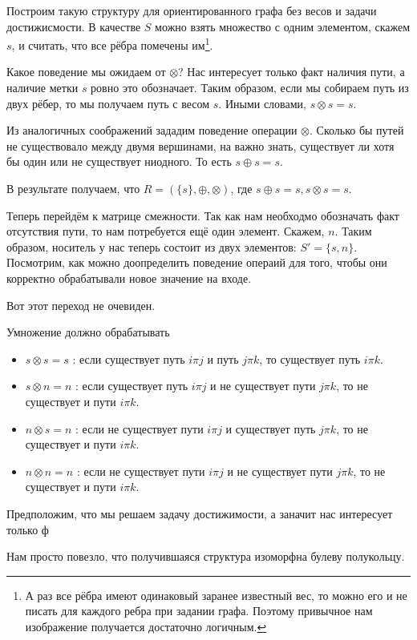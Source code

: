 \begin{example} Построим такую структуру для ориентированного графа без весов и задачи достижисмости. В качестве $S$ можно взять множество с одним элементом, скажем $s$, и считать, что все рёбра помечены им\footnote{А раз все рёбра имеют одинаковый заранее известный вес, то можно его и не писать для каждого ребра при задании графа. Поэтому привычное нам изображение получается достаточно логичным.}.  

Какое поведение мы ожидаем от $\otimes$? Нас интересует только факт наличия пути, а наличие метки $s$ ровно это обозначает. Таким образом, если мы собираем путь из двух рёбер, то мы получаем путь с весом $s$. Иными словами, $s \otimes s = s$. 

Из аналогичных соображений зададим поведение операции $\otimes$. Сколько бы путей не существовало между двумя вершинами, на важно знать, существует ли хотя бы один или не существует ниодного. То есть $s \oplus s = s$.

В результате получаем, что $R=(\{s\}, \oplus, \otimes)$, где $s \oplus s = s, s \otimes s = s$.

Теперь перейдём к матрице смежности. Так как нам необходмо обозначать факт отсутствия пути, то нам потребуется ещё один элемент. Скажем, $n$. Таким образом, носитель у нас теперь состоит из двух элементов: $S' = \{s,n\}$. Посмотрим, как можно доопределить поведение операий для того, чтобы они корректно обрабатывали новое значение на входе.

Вот этот переход не очевиден.

Умножение должно обрабатывать 
\begin{itemize}
\item $s \otimes s = s$ : если существует путь $i \pi j$ и путь $j \pi k$, то существует путь $i \pi k$.
\item $s \otimes n = n$ : если существует путь $i \pi j$ и не существует пути $j \pi k$, то не существует и пути $i \pi k$.
\item $n \otimes s = n$ : если не существует пути $i \pi j$ и существует путь $j \pi k$, то не существует и пути $i \pi k$.
\item $n \otimes n = n$ : если не существует пути $i \pi j$ и не существует пути $j \pi k$, то не существует и пути $i \pi k$.
\end{itemize}
Предположим, что мы решаем задачу достижимости, а заначит нас интересует только ф

Нам просто повезло, что получившаяся структура изоморфна булеву полукольцу. 

\end{example}

